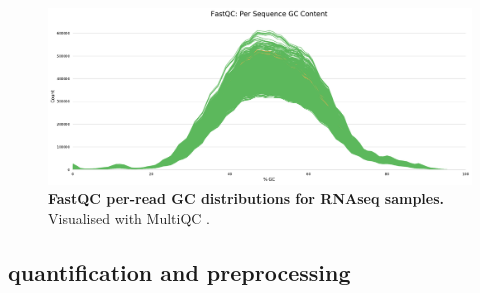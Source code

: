\begin{figure}
	\centering
	\includegraphics[width=\textwidth]{mainmatter/figures/chapter_02/graphics_firstYearReport/fastqc/mqc_fastqc_per_sequence_gc_content_plot_Counts.pdf}
    \caption{
        \textbf{FastQC per-read GC distributions for \gls{RNAseq} samples.}
        Visualised with MultiQC \autocite{ewels2016MultiQCSummarizeAnalysis}.
}
	\label{fig:fastqc_gc}
\end{figure}

\subsection{ quantification and preprocessing}
\label{subsec:hird_dge_rnaseq_quantAndFilter}

